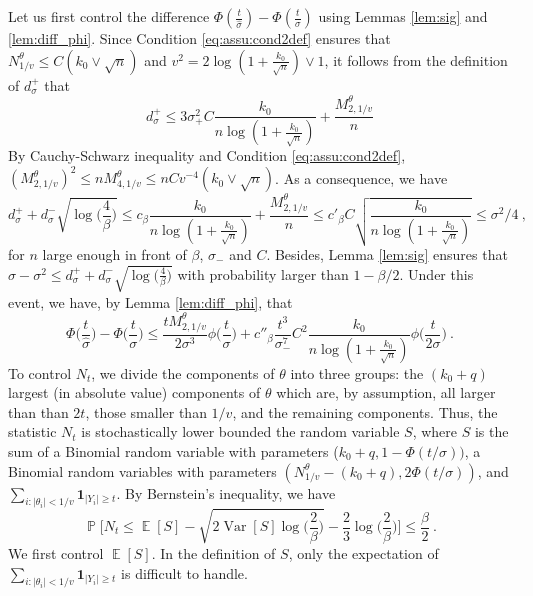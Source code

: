 \documentclass[twoside,11pt]{article}
\def\beq{\begin{equation}}
\def\eeq{\end{equation}}
\newcommand{\E}{\operatorname{\mathbb{E}}}
\renewcommand{\P}{\operatorname{\mathbb{P}}}
\newcommand{\Var}{\operatorname{Var}}
\newcommand{\<}{\langle}
\renewcommand{\>}{\rangle}
\begin{document}
Let us first control the difference $\Phi(\frac{t}{\widehat{\sigma}})-\Phi(\frac{t}{\sigma})$ using Lemmas \ref{lem:sig} and \ref{lem:diff_phi}. Since Condition \eqref{eq:assu:cond2def}
ensures that $N_{1/v}^{\theta}\leq  C (k_0\vee \sqrt{n})$ and $v^2= 2\log(1+\frac{k_0}{\sqrt{n}})\vee 1$, it follows from the definition of $d_{\sigma}^{+}$ that 
\[
 d_{\sigma}^+\leq  3\sigma_+^2C\frac{k_0}{n\log(1+\frac{k_0}{\sqrt{n}})}+ \frac{M_{2,1/v}^{\theta}}{n} 
\]
By Cauchy-Schwarz inequality and Condition \eqref{eq:assu:cond2def}, $(M^{\theta}_{2,1/v})^2\leq n M_{4,1/v}^{\theta}\leq  nC v^{-4} (k_0\vee \sqrt{n})$. As a consequence, we have 
 \beq\label{eq:upper2_d_+}
d_{\sigma}^+ + d_{\sigma}^-\sqrt{\log\big(\frac{4}{\beta}\big)}\leq  c_{\beta} \frac{k_0}{n\log(1+\frac{k_0}{\sqrt{n}})} + \frac{M_{2,1/v}^{\theta}}{n}\leq c'_{\beta}  C\sqrt{\frac{k_0}{n\log(1+\frac{k_0}{\sqrt{n}})}}\leq \sigma^2/4\ , 
 \eeq
 for $n$ large enough in front of $\beta$, $\sigma_-$ and $C$.
 Besides, Lemma \ref{lem:sig} ensures that $\widehat{\sigma}-\sigma^2\leq d_{\sigma}^+ + d_{\sigma}^-\sqrt{\log\big(\frac{4}{\beta}\big)}$ with probability larger than $1-\beta/2$.
Under this event, we have, by Lemma \ref{lem:diff_phi}, that 
\beq\label{eq:upper_sigma_hat}
\Phi\big(\frac{t}{\widehat{\sigma}}\big) -\Phi\big(\frac{t}{\sigma}\big) \leq \frac{tM_{2,1/v}^{\theta} }{2\sigma^3} \phi\big(\frac{t}{\sigma}\big) + c''_{\beta}\frac{t^3}{\sigma_-^7} C^2\frac{k_0}{n\log(1+\frac{k_0}{\sqrt{n}})}
  \phi\big(\frac{t}{2\sigma}\big)\ . 
\eeq 
To control $N_t$, we divide the components of $\theta$ into three groups: the $(k_0+q)$ largest  (in absolute value) components of $\theta$ which are, by assumption, all larger than  than $2t$, those smaller than $1/v$, and the remaining components. Thus, the statistic
$N_t$ is stochastically lower bounded the random variable $S$, where $S$ is the sum of a Binomial random variable with parameters ($k_0+q,1- \Phi(t/\sigma))$, a Binomial random variables with parameters $(N^{\theta}_{1/v}- (k_0+q),2\Phi(t/\sigma))$, and $\sum_{i: |\theta_i|< 1/v}\mathbf{1}_{|Y_i|\geq t}$. By Bernstein's inequality, we have 
\beq\label{eq:deviation_N_t}
\P\Big[N_t \leq \E[S] - \sqrt{2\Var[S]\log\big(\frac{2}{\beta}\big)} - \frac{2}{3}\log\big(\frac{2}{\beta}\big)\Big]\leq \frac{\beta}{2}\ .
\eeq
We first control $\E[S]$. In the definition of $S$, only the expectation of $\sum_{i: |\theta_i|< 1/v}\mathbf{1}_{|Y_i|\geq t}$ is difficult to handle. 
\end{document}
